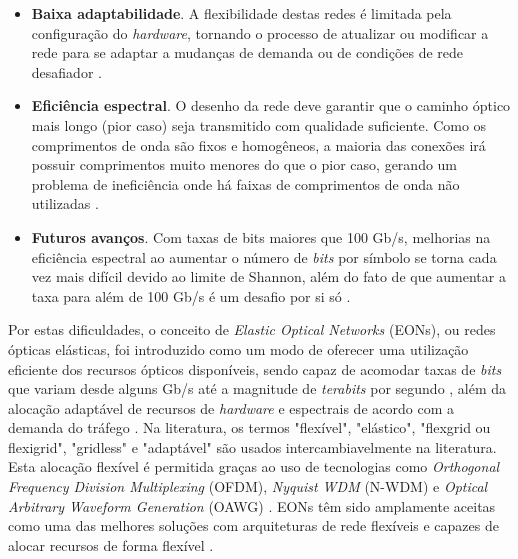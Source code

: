 \begin{itemize}
  \item \textbf{Baixa adaptabilidade}. A flexibilidade destas redes é limitada pela configuração do \textit{hardware}, tornando o processo de atualizar ou modificar a rede para se adaptar a mudanças de demanda ou de condições de rede desafiador \cite{eon_tutorial_2014}.
  \item \textbf{Eficiência espectral}. O desenho da rede deve garantir que o caminho óptico mais longo (pior caso) seja transmitido com qualidade suficiente. Como os comprimentos de onda são fixos e homogêneos, a maioria das conexões irá possuir comprimentos muito menores do que o pior caso, gerando um problema de ineficiência onde há faixas de comprimentos de onda não utilizadas \cite{jinno_eon_benefits,vizcaino_eon_energy}.
  \item \textbf{Futuros avanços}. Com taxas de bits maiores que 100 Gb/s, melhorias na eficiência espectral ao aumentar o número de \textit{bits} por símbolo se torna cada vez mais difícil devido ao limite de Shannon, além do fato de que aumentar a taxa para além de 100 Gb/s é um desafio por si só \cite{jinno_eon_benefits}.
\end{itemize}

Por estas dificuldades, o conceito de \textit{Elastic Optical Networks} (EONs), ou redes ópticas elásticas, foi introduzido como um modo de oferecer uma utilização eficiente dos recursos ópticos disponíveis, sendo capaz de acomodar taxas de \textit{bits} que variam desde alguns Gb/s até a magnitude de \textit{terabits} por segundo \cite{eon_tutorial_2014, eon_survey_2012}, além da alocação adaptável de recursos de \textit{hardware} e espectrais de acordo com a demanda do tráfego \cite{jinno_eon_benefits}. Na literatura, os termos "flexível", "elástico", "flexgrid ou flexigrid", "gridless" e "adaptável" são usados intercambiavelmente na literatura. Esta alocação flexível é permitida graças ao uso de tecnologias como \textit{Orthogonal Frequency Division Multiplexing} (OFDM), \textit{Nyquist WDM} (N-WDM) e \textit{Optical Arbitrary Waveform Generation} (OAWG) \cite{eon_tutorial_2014}. EONs têm sido amplamente aceitas como uma das melhores soluções com arquiteturas de rede flexíveis e capazes de alocar recursos de forma flexível \cite{eon_ml_rsa_dl_2019}.

